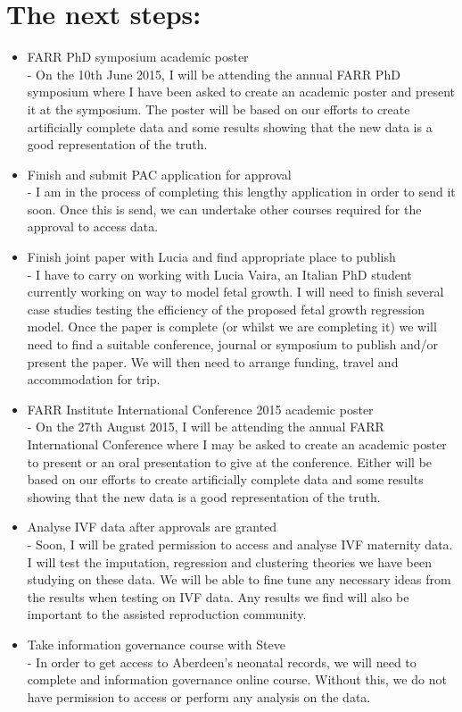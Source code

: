 \documentclass[bsc]{abdnthesis}
\begin{document}
\section{The next steps:} %
\label{sec:immediate_things_to_do_}
\begin{itemize}
	\item FARR PhD symposium academic poster \\ - On the 10th June 2015, I will be attending the annual FARR PhD symposium where I have been asked to create an academic poster and present it at the symposium. The poster will be based on our efforts to create artificially complete data and some results showing that the new data is a good representation of the truth.
	\item Finish and submit PAC application for approval \\ - I am in the process of completing this lengthy application in order to send it soon. Once this is send, we can undertake other courses required for the approval to access data. 
	\item Finish joint paper with Lucia and find appropriate place to publish \\ - I have to carry on working with Lucia Vaira, an Italian PhD student currently working on way to model fetal growth. I will need to finish several case studies testing the efficiency of the proposed fetal growth regression model. Once the paper is complete (or whilst we are completing it) we will need to find a suitable conference, journal or symposium to publish and/or present the paper. We will then need to arrange funding, travel and accommodation for trip.
	\item FARR Institute International Conference 2015 academic poster \\ - On the 27th August 2015, I will be attending the annual FARR International Conference where I may be asked to create an academic poster to present or an oral presentation to give at the conference. Either will be based on our efforts to create artificially complete data and some results showing that the new data is a good representation of the truth.
	\item Analyse IVF data after approvals are granted \\ - Soon, I will be grated permission to access and analyse IVF maternity data. I will test the imputation, regression and clustering theories we have been studying on these data. We will be able to fine tune any necessary ideas from the results when testing on IVF data. Any results we find will also be important to the assisted reproduction community. 	
	\item Take information governance course with Steve \\ - In order to get access to Aberdeen's neonatal records, we will need to complete and information governance online course. Without this, we do not have permission to access or perform any analysis on the data.  
\end{itemize}




\end{document}
